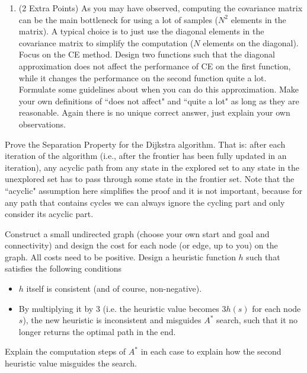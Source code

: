 \documentclass{article}
\begin{document}
\begin{question}
\begin{enumerate}
    \item (2 Extra Points) As you may have observed, computing the covariance matrix can be the main bottleneck for using a lot of samples ($N^2$ elements in the matrix). A typical choice is to just use the diagonal elements in the covariance matrix to simplify the computation ($N$ elements on the diagonal). Focus on the CE method. Design two functions such that the diagonal approximation does not affect the performance of CE on the first function, while it changes the performance on the second function quite a lot. Formulate some guidelines about when you can do this approximation. Make your own definitions of ``does not affect" and ``quite a lot" as long as they are reasonable. Again there is no unique correct answer, just explain your own observations. 
\end{enumerate}
\end{question}

\begin{question}[1 Point] 
Prove the Separation Property for the Dijkstra algorithm. That is: after each  iteration of the algorithm (i.e., after the frontier has been fully updated in an iteration), any acyclic path from any state in the explored set to any state in the unexplored set has to pass through some state in the frontier set. Note that the ``acyclic" assumption here simplifies the proof and it is not important, because for any path that contains cycles we can always ignore the cycling part and only consider its acyclic part.
\end{question}

\begin{question}[1 Point]
Construct a small undirected graph (choose your own start and goal and connectivity) and design the cost for each node (or edge, up to you) on the graph. All costs need to be positive. Design a heuristic function $h$ such that satisfies the following conditions
\begin{itemize}
\item $h$ itself is consistent (and of course, non-negative). 
\item By multiplying it by $3$ (i.e. the heuristic value becomes $3h(s)$ for each node $s$), the new heuristic is inconsistent and misguides $A^*$ search, such that it no longer returns the optimal path in the end. 
\end{itemize}
Explain the computation steps of $A^*$ in each case to explain how the second heuristic value misguides the search. 
\end{question}
\end{document}
